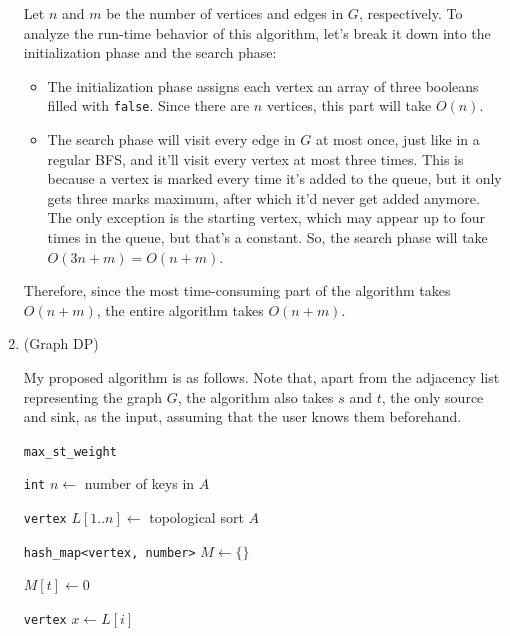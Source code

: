 \documentclass{article}
\begin{document}
\begin{enumerate}
    Let $n$ and $m$ be the number of vertices and edges in $G$, respectively. To analyze the run-time behavior of this algorithm, let's break it down into the initialization phase and the search phase:
    \begin{itemize}
      \item The initialization phase assigns each vertex an array of three booleans filled with \texttt{false}. Since there are $n$ vertices, this part will take $O(n)$.
      \item The search phase will visit every edge in $G$ at most once, just like in a regular BFS, and it'll visit every vertex at most three times. This is because a vertex is marked every time it's added to the queue, but it only gets three marks maximum, after which it'd never get added anymore. The only exception is the starting vertex, which may appear up to four times in the queue, but that's a constant. So, the search phase will take $O(3n + m) = O(n + m)$.
    \end{itemize}

    Therefore, since the most time-consuming part of the algorithm takes $O(n + m)$, the entire algorithm takes $O(n + m)$.

    \pagebreak

  \item (Graph DP)

    My proposed algorithm is as follows. Note that, apart from the adjacency list representing the graph $G$, the algorithm also takes $s$ and $t$, the only source and sink, as the input, assuming that the user knows them beforehand.

    \begin{center}
      \begin{minipage}{\linewidth}
        \renewcommand{\thealgocf}{}
        \begin{algorithm}[H]
          \caption{\texttt{max\_st\_weight}}

          \texttt{int} $n \gets$ number of keys in $A$

          \texttt{vertex} $L[1..n] \gets$ topological sort $A$

          \texttt{hash\_map<vertex, number>} $M \gets \{\}$

          $M[t] \gets 0$

          {
          \texttt{vertex} $x \gets L[i]$

}
\end{algorithm}
\end{minipage}
\end{center}
\end{enumerate}
\end{document}
